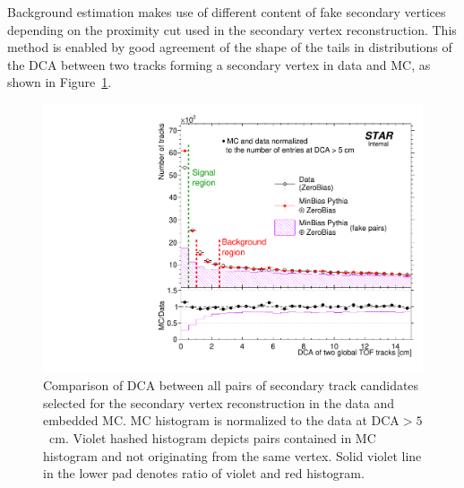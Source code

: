 Background estimation makes use of different content of fake secondary vertices depending on the proximity cut used in the secondary vertex reconstruction. This method is enabled by good agreement of the shape of the tails in distributions of the DCA between two tracks forming a secondary vertex in data and MC, as shown in Figure~\ref{fig:DcaOfTwoGlobalTofTrksWithLargeD0_DataVsMC}. %
%
\begin{figure}[t!]\vspace{-2pt}%
\centering%
\begin{minipage}{.4725\textwidth}%
  \centering%
  \includegraphics[width=\linewidth]{graphics/deadMaterial/DcaOfTwoGlobalTofTrksWithLargeD0_DataVsMC.pdf}\vspace{-5pt}%
  \caption[Comparison of DCA between all pairs of secondary track candidates selected for the secondary vertex reconstruction in the data and embedded MC.]%
  {Comparison of DCA between all pairs of secondary track candidates selected for the secondary vertex reconstruction  in the data and embedded MC. MC histogram is normalized to the data at $\text{DCA}>5$~cm. Violet hashed histogram depicts pairs contained in MC histogram and not originating from the same vertex. Solid violet line in the lower pad denotes ratio of violet and red histogram.\newline\newline }\label{fig:DcaOfTwoGlobalTofTrksWithLargeD0_DataVsMC}
\end{minipage}%
\quad\quad%
\begin{minipage}{.4725\textwidth}%
  \centering%

\end{minipage}
\end{figure}
